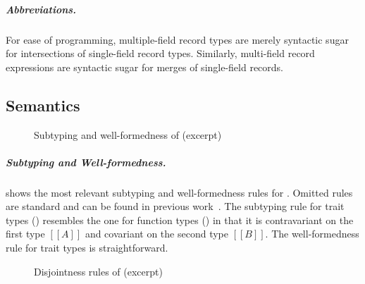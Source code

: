 \subparagraph{Abbreviations.}
For ease of programming, multiple-field record types are merely syntactic sugar
for intersections of single-field record types. Similarly, multi-field record
expressions are syntactic sugar for merges of single-field records.




\subsection{Semantics}


\renewcommand\ottaltinferrule[4]{
  \inferrule*[narrower=0.9,right=#1,#2]
    {#3}
    {#4}
}

\begin{figure}[t]
  \centering
  \begin{small}
  \end{small}
  \caption{Subtyping and well-formedness of \name (excerpt)}
  \label{fig:typesystem}
\end{figure}

\renewcommand\ottaltinferrule[4]{
  \inferrule*[narrower=0.9,lab=#1,#2]
    {#3}
    {#4}
}


\subparagraph{Subtyping and Well-formedness.}
 shows the most relevant subtyping and well-formedness
rules for \name. Omitted rules are standard and can be found in previous
work~\cite{alpuimdisjoint}. The
subtyping rule for trait types () resembles the one for function
types () in that it is contravariant on the first type $[[A]]$
and covariant on the second type $[[B]]$. The well-formedness rule for trait
types is straightforward.

\begin{figure}[t]
  \centering
  \begin{small}
  \end{small}
  \caption{Disjointness rules of \name (excerpt)}
  \label{fig:disjoint}
\end{figure}


